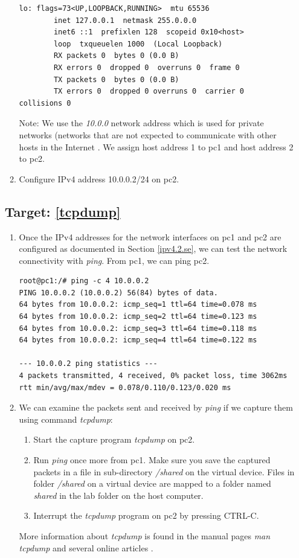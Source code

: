 \documentclass[12pt]{book}
\begin{document}
\begin{enumerate}[label=\arabic*.]
\begin{enumerate}[resume*]
\begin{lstlisting}
lo: flags=73<UP,LOOPBACK,RUNNING>  mtu 65536
        inet 127.0.0.1  netmask 255.0.0.0
        inet6 ::1  prefixlen 128  scopeid 0x10<host>
        loop  txqueuelen 1000  (Local Loopback)
        RX packets 0  bytes 0 (0.0 B)
        RX errors 0  dropped 0  overruns 0  frame 0
        TX packets 0  bytes 0 (0.0 B)
        TX errors 0  dropped 0 overruns 0  carrier 0  collisions 0
  \end{lstlisting}

  Note: We use the \emph{10.0.0} network address which is used for private networks (networks that are not expected to communicate with other hosts in the Internet \cite{rfc1918}. We assign host address 1 to pc1 and host address 2 to pc2.

\item Configure IPv4 address 10.0.0.2/24 on pc2.

  \end{enumerate}

\subsection{Target: \ref{tcpdump}}\label{tcpdump.se}

\begin{enumerate}[resume*]
\item Once the IPv4 addresses for the network interfaces on pc1 and pc2 are configured as documented in Section \ref{ipv4.2.se}, we can test the network connectivity with \emph{ping}. From pc1, we can ping pc2.

  \begin{lstlisting}
root@pc1:/# ping -c 4 10.0.0.2
PING 10.0.0.2 (10.0.0.2) 56(84) bytes of data.
64 bytes from 10.0.0.2: icmp_seq=1 ttl=64 time=0.078 ms
64 bytes from 10.0.0.2: icmp_seq=2 ttl=64 time=0.123 ms
64 bytes from 10.0.0.2: icmp_seq=3 ttl=64 time=0.118 ms
64 bytes from 10.0.0.2: icmp_seq=4 ttl=64 time=0.122 ms

--- 10.0.0.2 ping statistics ---
4 packets transmitted, 4 received, 0% packet loss, time 3062ms
rtt min/avg/max/mdev = 0.078/0.110/0.123/0.020 ms
  \end{lstlisting}

\item We can examine the packets sent and received by \emph{ping} if we capture them using command \emph{tcpdump}:
\begin{enumerate}
\item Start the capture program \emph{tcpdump} on pc2.
\item Run \emph{ping} once more from pc1. Make sure you save the captured packets in a file in sub-directory \emph{/shared} on the virtual device. Files in folder \emph{/shared} on a virtual device are mapped to a folder named \emph{shared} in the lab folder on the host computer.
\item Interrupt the \emph{tcpdump} program on pc2 by pressing CTRL-C.
\end{enumerate}
  More information about \emph{tcpdump} is found in the manual pages \emph{man tcpdump} and several online articles \cite{tcpdump,tcpdump2}.


\end{enumerate}
\end{enumerate}
\end{document}
